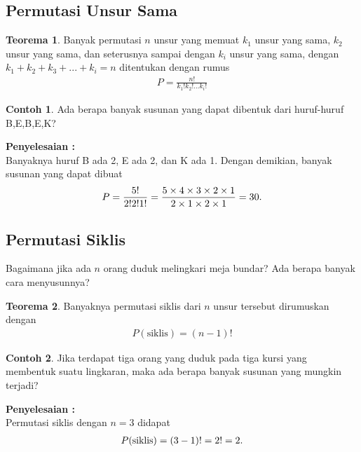 \documentclass[aspectratio=169]{beamer}
\theoremstyle{definition}
\newtheorem{teorema}{Teorema}
\newtheorem{contoh}{Contoh}
\begin{document}
\subsection{Permutasi Unsur Sama}
\begin{frame}{\insertsection}{\insertsubsection}
  \begin{teorema}
    Banyak permutasi $n$ unsur yang memuat $k_1$ unsur yang sama, $k_2$ unsur yang sama, dan seterusnya sampai dengan $k_i$ unsur yang sama, dengan $k_1+k_2+k_3+...+k_i=n$ ditentukan dengan rumus
    \begin{align}
      P=\frac{n!}{k_1!k_2!...k_i!}
    \end{align}
  \end{teorema}
\end{frame}

\begin{frame}{\insertsection}{\insertsubsection}
  \begin{contoh}
    Ada berapa banyak susunan yang dapat dibentuk dari huruf-huruf B,E,B,E,K?

    \textbf{Penyelesaian : }\\
    Banyaknya huruf B ada 2, E ada 2, dan K ada 1. Dengan demikian, banyak susunan yang dapat dibuat
    \begin{align}
      P=\frac{5!}{2!2!1!}=\frac{5 \times 4 \times 3 \times 2 \times 1}{2 \times 1 \times 2 \times 1}=30. \notag
    \end{align}
  \end{contoh}
\end{frame}

\subsection{Permutasi Siklis}
\begin{frame}{\insertsection}{\insertsubsection}
  Bagaimana jika ada $n$ orang duduk melingkari meja bundar? Ada berapa banyak cara menyusunnya?
  \begin{teorema}
    Banyaknya permutasi siklis dari $n$ unsur tersebut dirumuskan dengan
    \begin{align}
      P(\text{siklis}) = (n-1)!
    \end{align}
  \end{teorema}
\end{frame}

\begin{frame}{\insertsection}{\insertsubsection}
  \begin{contoh}
    Jika terdapat tiga orang yang duduk pada tiga kursi yang membentuk suatu lingkaran, maka ada berapa banyak susunan yang mungkin terjadi?

    \textbf{Penyelesaian : }\\
    Permutasi siklis dengan $n=3$ didapat
    \begin{align}
      P(\text{siklis})=(3-1)!=2!=2. \notag
    \end{align}
  \end{contoh}
\end{frame}
\end{document}
